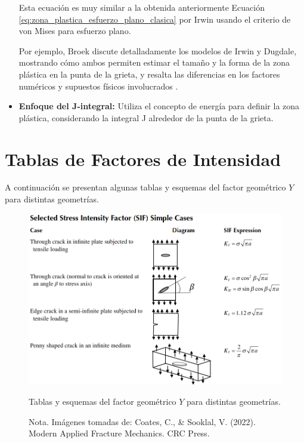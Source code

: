\documentclass[12pt,letterpaper]{article}
\begin{document}
\begin{itemize}
    Esta ecuación es muy similar a la obtenida anteriormente Ecuación \eqref{eq:zona_plastica_esfuerzo_plano_clasica} por Irwin usando el criterio de von Mises para esfuerzo plano.

    Por ejemplo, Broek discute detalladamente los modelos de Irwin y Dugdale, mostrando cómo ambos permiten estimar el tamaño y la forma de la zona plástica en la punta de la grieta, y resalta las diferencias en los factores numéricos y supuestos físicos involucrados \cite{Broek1982}.
    \item \textbf{Enfoque del J-integral:} Utiliza el concepto de energía para definir la zona plástica, considerando la integral J alrededor de la punta de la grieta.

\end{itemize}

\section{Tablas de Factores de Intensidad}

A continuación se presentan algunas tablas y esquemas del factor geométrico $Y$ para distintas geometrías.

\begin{figure}[H]
    \centering
    \includegraphics[width=0.65\linewidth]{cc.png} %
    \caption{Tablas y esquemas del factor geométrico $Y$ para distintas geometrías.}
    \label{fig:factor_intensidad_Y}
    \caption*{Nota. Imágenes tomadas de: Coates, C., \& Sooklal, V. (2022). Modern Applied Fracture Mechanics. CRC Press.}
    \end{figure}
\end{document}
